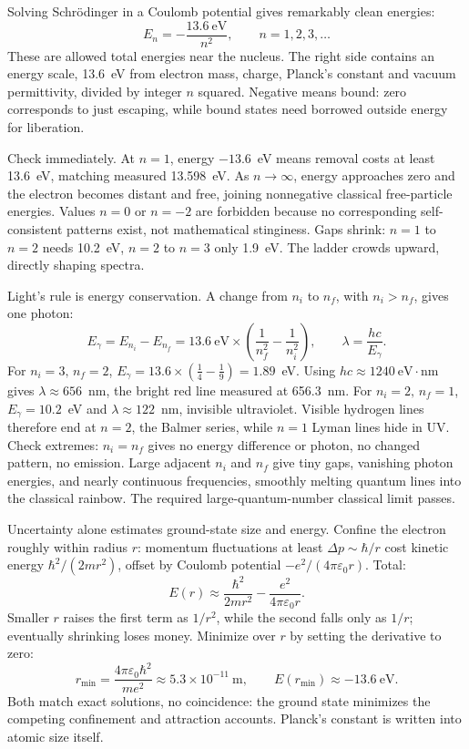 
Solving Schrödinger in a Coulomb potential gives remarkably clean energies:
\[
E_n=-\frac{13.6\ \mathrm{eV}}{n^2},\qquad n=1,2,3,\dots
\]
These are allowed total energies near the nucleus. The right side contains an energy scale, 13.6~eV from electron mass, charge, Planck's constant and vacuum permittivity, divided by integer \(n\) squared. Negative means bound: zero corresponds to just escaping, while bound states need borrowed outside energy for liberation.

Check immediately. At \(n=1\), energy \(-13.6\)~eV means removal costs at least 13.6~eV, matching measured 13.598~eV. As \(n\to\infty\), energy approaches zero and the electron becomes distant and free, joining nonnegative classical free-particle energies. Values \(n=0\) or \(n=-2\) are forbidden because no corresponding self-consistent patterns exist, not mathematical stinginess. Gaps shrink: \(n=1\) to \(n=2\) needs 10.2~eV, \(n=2\) to \(n=3\) only 1.9~eV. The ladder crowds upward, directly shaping spectra.

Light's rule is energy conservation. A change from \(n_i\) to \(n_f\), with \(n_i>n_f\), gives one photon:
\[
E_\gamma=E_{n_i}-E_{n_f}=13.6\ \mathrm{eV}\times\left(\frac{1}{n_f^2}-\frac{1}{n_i^2}\right),
\qquad \lambda=\frac{hc}{E_\gamma}.
\]
For \(n_i=3,\,n_f=2\), \(E_\gamma=13.6\times(\frac14-\frac19)=1.89\)~eV. Using \(hc\approx1240\ \mathrm{eV\cdot nm}\) gives \(\lambda\approx656\)~nm, the bright red line measured at 656.3~nm. For \(n_i=2,\,n_f=1\), \(E_\gamma=10.2\)~eV and \(\lambda\approx122\)~nm, invisible ultraviolet. Visible hydrogen lines therefore end at \(n=2\), the Balmer series, while \(n=1\) Lyman lines hide in UV. Check extremes: \(n_i=n_f\) gives no energy difference or photon, no changed pattern, no emission. Large adjacent \(n_i\) and \(n_f\) give tiny gaps, vanishing photon energies, and nearly continuous frequencies, smoothly melting quantum lines into the classical rainbow. The required large-quantum-number classical limit passes.

\begin{mathbridge}
Uncertainty alone estimates ground-state size and energy. Confine the electron roughly within radius \(r\): momentum fluctuations at least \(\Delta p\sim \hbar/r\) cost kinetic energy \(\hbar^2/(2mr^2)\), offset by Coulomb potential \(-e^2/(4\pi\varepsilon_0 r)\). Total:
\[
E(r)\approx\frac{\hbar^2}{2mr^2}-\frac{e^2}{4\pi\varepsilon_0 r}.
\]
Smaller \(r\) raises the first term as \(1/r^2\), while the second falls only as \(1/r\); eventually shrinking loses money. Minimize over \(r\) by setting the derivative to zero:
\[
r_{\min}=\frac{4\pi\varepsilon_0\hbar^2}{me^2}\approx 5.3\times10^{-11}\ \mathrm{m},
\qquad E(r_{\min})\approx-13.6\ \mathrm{eV}.
\]
Both match exact solutions, no coincidence: the ground state minimizes the competing confinement and attraction accounts. Planck's constant is written into atomic size itself.
\end{mathbridge}

